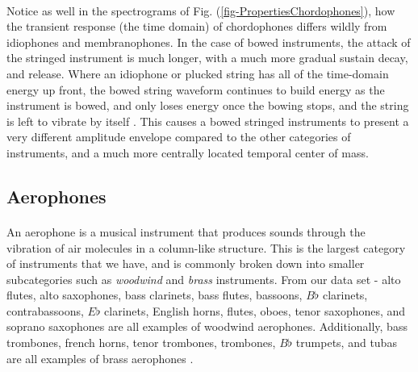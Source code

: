 \documentclass[12pt,letterpaper]{article}
\begin{document}
\paragraph*{}Notice as well in the spectrograms of Fig. (\ref{fig-PropertiesChordophones}), how the transient response (the time domain) of chordophones differs wildly from idiophones and membranophones. In the case of bowed instruments, the attack of the stringed instrument is much longer, with a much more gradual sustain decay, and release. Where an idiophone or plucked string has all of the time-domain energy up front, the bowed string waveform continues to build energy as the instrument is bowed, and only loses energy once the bowing stops, and the string is left to vibrate by itself \cite{Hunter}. This causes a bowed stringed instruments to present a very different amplitude envelope compared to the other categories of instruments, and a much more centrally located temporal center of mass.


\subsection{Aerophones}
\label{subsec-Aerophones}

\paragraph*{}An aerophone is a musical instrument that produces sounds through the vibration of air molecules in a column-like structure. This is the largest category of instruments that we have, and is commonly broken down into smaller subcategories such as \textit{woodwind} and \textit{brass} instruments. From our data set - alto flutes, alto saxophones, bass clarinets, bass flutes, bassoons, $B\flat$ clarinets, contrabassoons, $E\flat$ clarinets, English horns, flutes, oboes, tenor saxophones, and soprano saxophones are all examples of woodwind aerophones. Additionally, bass trombones, french horns, tenor trombones, trombones, $B\flat$ trumpets, and tubas are all examples of brass aerophones \cite{Hornbostel,Olson,White}.
\end{document}

